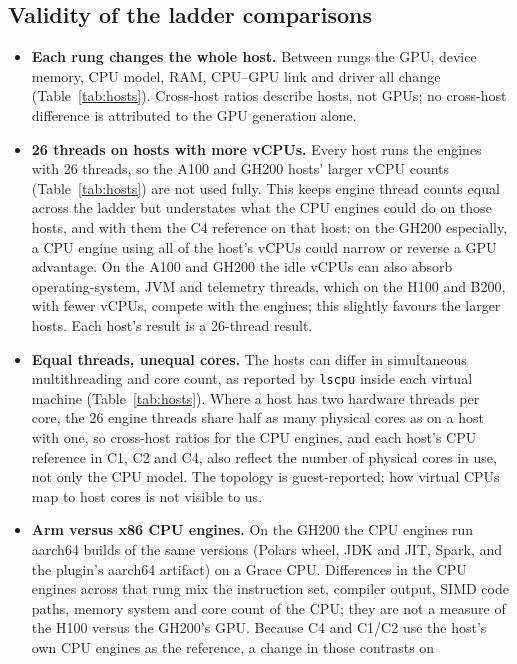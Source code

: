 \documentclass[11pt]{article}
\begin{document}
\subsection{Validity of the ladder comparisons}
\begin{itemize}[leftmargin=*,itemsep=2pt]
  \item \textbf{Each rung changes the whole host.} Between rungs the GPU,
    device memory, CPU model, RAM, CPU--GPU link and driver
    all change (Table~\ref{tab:hosts}). Cross-host ratios describe hosts, not
    GPUs; no cross-host difference is attributed to the GPU generation alone.
  \item \textbf{26 threads on hosts with more vCPUs.} Every host runs the
    engines with 26 threads, so the A100 and GH200 hosts' larger vCPU counts
    (Table~\ref{tab:hosts}) are not used fully. This keeps engine thread counts equal across the ladder but
    understates what the CPU engines could do on those hosts, and with them
    the C4 reference on that host: on the GH200 especially, a CPU engine using
    all of the host's vCPUs could narrow or reverse a GPU advantage. On the A100 and
    GH200 the idle vCPUs can also absorb operating-system, JVM and telemetry
    threads, which on the H100 and B200, with fewer vCPUs, compete with the engines; this
    slightly favours the larger hosts. Each host's result is a 26-thread
    result.
  \item \textbf{Equal threads, unequal cores.} The hosts can differ in
    simultaneous multithreading and core count, as reported by \texttt{lscpu}
    inside each virtual machine (Table~\ref{tab:hosts}). Where a host has two
    hardware threads per core, the 26 engine threads share half as many
    physical cores as on a host with one, so cross-host ratios for the CPU
    engines, and each host's CPU reference in C1, C2 and C4, also reflect the
    number of physical cores in use, not only the CPU model. The topology is
    guest-reported; how virtual CPUs map to host cores is not visible to us.
  \item \textbf{Arm versus x86 CPU engines.} On the GH200 the CPU engines run
    aarch64 builds of the same versions (Polars wheel, JDK and JIT, Spark, and
    the plugin's aarch64 artifact) on a Grace CPU. Differences in the CPU
    engines across that rung mix the instruction set, compiler output, SIMD
    code paths, memory system and core count of the CPU; they are not a
    measure of the H100 versus the GH200's GPU. Because C4 and C1/C2 use the
    host's own CPU engines as the reference, a change in those contrasts on

\end{itemize}
\end{document}
